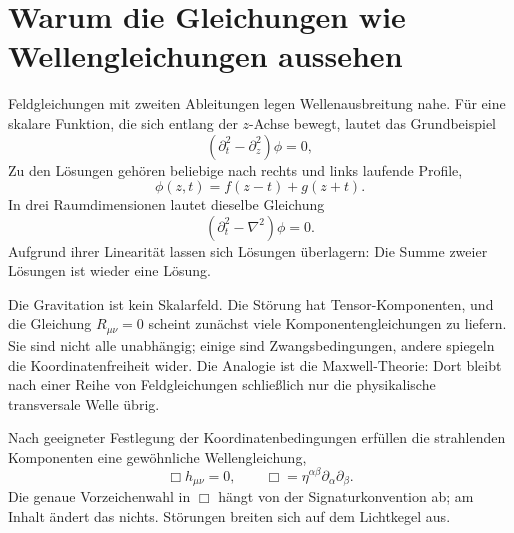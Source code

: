 \begin{classroomqa}
\end{classroomqa}

\section{Warum die Gleichungen wie Wellengleichungen aussehen}

Feldgleichungen mit zweiten Ableitungen legen Wellenausbreitung nahe. Für eine skalare Funktion, die sich entlang der \(z\)-Achse bewegt, lautet das Grundbeispiel
\begin{equation}
 \left(\partial_t^2-\partial_z^2\right)\phi=0,
\end{equation}
Zu den Lösungen gehören beliebige nach rechts und links laufende Profile,
\begin{equation}
 \phi(z,t)=f(z-t)+g(z+t).
\end{equation}
In drei Raumdimensionen lautet dieselbe Gleichung
\begin{equation}
 \left(\partial_t^2-\nabla^2\right)\phi=0.
\end{equation}
Aufgrund ihrer Linearität lassen sich Lösungen überlagern: Die Summe zweier Lösungen ist wieder eine Lösung.

Die Gravitation ist kein Skalarfeld. Die Störung hat Tensor-Komponenten, und die Gleichung \(R_{\mu\nu}=0\) scheint zunächst viele Komponentengleichungen zu liefern. Sie sind nicht alle unabhängig; einige sind Zwangsbedingungen, andere spiegeln die Koordinatenfreiheit wider. Die Analogie ist die Maxwell-Theorie: Dort bleibt nach einer Reihe von Feldgleichungen schließlich nur die physikalische transversale Welle übrig.

Nach geeigneter Festlegung der Koordinatenbedingungen erfüllen die strahlenden Komponenten eine gewöhnliche Wellengleichung,
\begin{equation}
 \Box h_{\mu\nu}=0,
 \qquad
 \Box=\eta^{\alpha\beta}\partial_\alpha\partial_\beta.
 \label{eq:linear-wave}
\end{equation}
Die genaue Vorzeichenwahl in \(\Box\) hängt von der Signaturkonvention ab; am Inhalt ändert das nichts. Störungen breiten sich auf dem Lichtkegel aus.

